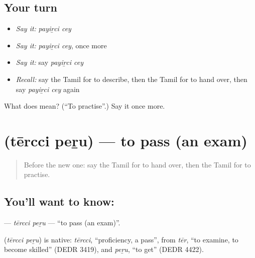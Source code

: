 \subsection*{Your turn}
\begin{itemize}
\raggedright
  \item \emph{Say it:} \emph{payiṟci cey}
  \item \emph{Say it:} \emph{payiṟci cey}, once more
  \item \emph{Say it:} say \emph{payiṟci cey}
  \item \emph{Recall:} say the Tamil for to describe, then the Tamil for to hand over, then say \emph{payiṟci cey} again
\end{itemize}

\begin{tcolorbox}[breakable,colback=teal!4,colframe=teal!35!black,title={Before you move on}]
What does   mean? (\textquotedblleft{}To practise\textquotedblright{}.) Say it once more.
\end{tcolorbox}
\section[\texorpdfstring{\ta{தேர்ச்சி} \ta{பெறு} (tērcci peṟu)}{தேர்ச்சி பெறு (tērcci peṟu)}]{  (tērcci peṟu) — to pass (an exam)}

\label{lesson:TA-C164-tercci-peru}



\begin{quote}
Before the new one: say the Tamil for to hand over, then the Tamil for to practise.
\end{quote}

\subsection*{You'll want to know:  }
\textbf{ } — \emph{tērcci peṟu} — \textquotedblleft{}to pass (an exam)\textquotedblright{}.

\begin{cousinweb}
\textbf{ } (\emph{tērcci peṟu}) is native: \emph{tērcci}, \textquotedblleft{}proficiency, a pass\textquotedblright{}, from \emph{tēr}, \textquotedblleft{}to examine, to become skilled\textquotedblright{} (DEDR 3419), and \emph{peṟu}, \textquotedblleft{}to get\textquotedblright{} (DEDR 4422).
\end{cousinweb}


